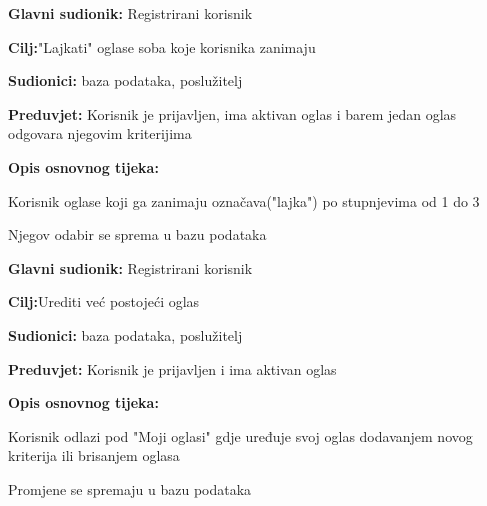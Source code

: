 \noindent {}
\begin{packed_item}

	\item \textbf{Glavni sudionik: }Registrirani korisnik
	\item  \textbf{Cilj:}"Lajkati" oglase soba koje korisnika zanimaju
	\item  \textbf{Sudionici:} baza podataka, poslužitelj
	\item  \textbf{Preduvjet:} Korisnik je prijavljen, ima aktivan oglas i barem jedan oglas odgovara njegovim kriterijima
	\item  \textbf{Opis osnovnog tijeka:}

	\item[] \begin{packed_enum}

				\item Korisnik oglase koji ga zanimaju označava("lajka") po stupnjevima od 1 do 3
				\item Njegov odabir se sprema u bazu podataka

	\end{packed_enum}

\end{packed_item}

\noindent {}
\begin{packed_item}

	\item \textbf{Glavni sudionik: }Registrirani korisnik
	\item  \textbf{Cilj:}Urediti već postojeći oglas
	\item  \textbf{Sudionici:} baza podataka, poslužitelj
	\item  \textbf{Preduvjet:} Korisnik je prijavljen i ima aktivan oglas
	\item  \textbf{Opis osnovnog tijeka:}

	\item[] \begin{packed_enum}

				\item Korisnik odlazi pod "Moji oglasi" gdje uređuje svoj oglas dodavanjem novog kriterija ili brisanjem oglasa
				\item Promjene se spremaju u bazu podataka

	\end{packed_enum}
\end{packed_item}

